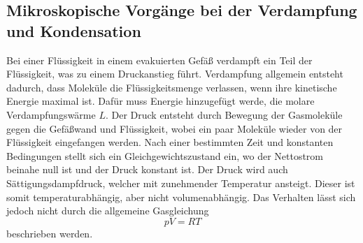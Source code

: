 \subsection{Mikroskopische Vorgänge bei der Verdampfung und Kondensation} %
\label{sub:Mikro_Vorgänge}
Bei einer Flüssigkeit in einem evakuierten Gefäß verdampft ein Teil der Flüssigkeit, was zu einem Druckanstieg führt.
Verdampfung allgemein entsteht dadurch, dass Moleküle die Flüssigkeitsmenge verlassen, wenn ihre kinetische Energie maximal ist.
Dafür muss Energie hinzugefügt werde, die molare Verdampfungswärme $L$.
Der Druck entsteht durch Bewegung der Gasmoleküle gegen die Gefäßwand und Flüssigkeit, wobei ein paar Moleküle wieder von der Flüssigkeit eingefangen werden.
Nach einer bestimmten Zeit und konstanten Bedingungen stellt sich ein Gleichgewichtszustand ein, wo der Nettostrom beinahe null ist und der Druck konstant ist.
Der Druck wird auch Sättigungsdampfdruck, welcher mit zunehmender Temperatur ansteigt.
Dieser ist somit temperaturabhängig, aber nicht volumenabhängig.
Das Verhalten lässt sich jedoch nicht durch die allgemeine Gasgleichung
\begin{equation*}
    pV = RT
\end{equation*}
beschrieben werden.

 
